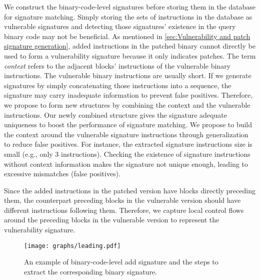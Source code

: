 We construct the binary-code-level signatures before storing them in the database for signature matching. 
Simply storing the sets of instructions in the database as vulnerable signatures and detecting those signatures' existence in the query binary code may not be beneficial. 
As mentioned in \autoref{sec:Vulnerability and patch signature generation}, added instructions in the patched binary cannot directly be used to form a vulnerability signature because it only indicates patches. 
The term \textit{context} refers to the adjacent blocks' instructions of the vulnerable binary instructions. 
The vulnerable binary instructions are usually short.
If we generate signatures by simply concatenating those instructions into a sequence, the signature may carry inadequate information to prevent false positives.
Therefore, we propose to form new structures by combining the context and the vulnerable instructions. 
Our newly combined structure gives the signature adequate uniqueness to boost the performance of signature matching.
We propose to build the context around the vulnerable signature instructions through generalization to reduce false positives. 
For instance, the extracted signature instructions size is small (e.g., only 3 instructions).
Checking the existence of signature instructions without context information makes the signature not unique enough, leading to excessive mismatches (false positives). 


Since the added instructions in the patched version have blocks directly preceding them, the counterpart preceding blocks in the vulnerable version should have different instructions following them. 
Therefore, we capture local control flows around the preceding blocks in the vulnerable version to represent the vulnerability signature.  


\begin{figure}[!t]
\centering
\texttt{[image: graphs/leading.pdf]}
\caption{An example of binary-code-level add signature and the steps to extract the corresponding binary signature.}
\label{fig:leading}
\end{figure}

